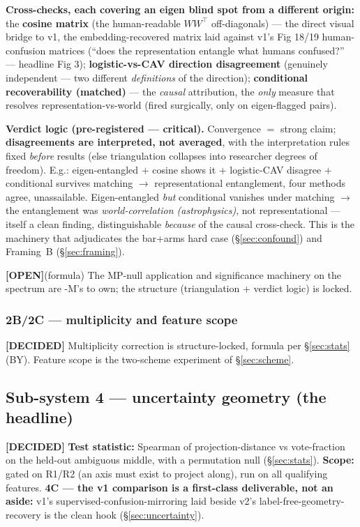 \documentclass[11pt,a4paper]{article}
\newcommand{\dec}{\textcolor{decided}{\sffamily\bfseries[DECIDED]}}
\newcommand{\opn}{\textcolor{openq}{\sffamily\bfseries[OPEN]}}
\begin{document}
\textbf{Cross-checks, each covering an eigen blind spot from a different origin:} the
\textbf{cosine matrix} (the human-readable $WW^\top$ off-diagonals) --- the direct visual bridge
to v1, the embedding-recovered matrix laid against v1's Fig 18/19 human-confusion matrices
(``does the representation entangle what humans confused?'' --- headline Fig 3);
\textbf{logistic-vs-CAV direction disagreement} (genuinely independent --- two different
\emph{definitions} of the direction); \textbf{conditional recoverability (matched)} --- the
\emph{causal} attribution, the \emph{only} measure that resolves representation-vs-world (fired
surgically, only on eigen-flagged pairs).

\begin{decidedbox}
\textbf{Verdict logic (pre-registered --- critical).} Convergence $=$ strong claim;
\textbf{disagreements are interpreted, not averaged}, with the interpretation rules fixed
\emph{before} results (else triangulation collapses into researcher degrees of freedom). E.g.:
eigen-entangled $+$ cosine shows it $+$ logistic-CAV disagree $+$ conditional survives matching
$\rightarrow$ representational entanglement, four methods agree, unassailable. Eigen-entangled
\emph{but} conditional vanishes under matching $\rightarrow$ the entanglement was
\emph{world-correlation (astrophysics)}, not representational --- itself a clean finding,
distinguishable \emph{because} of the causal cross-check. This is the machinery that adjudicates
the bar+arms hard case (\S\ref{sec:confound}) and Framing~B (\S\ref{sec:framing}).
\end{decidedbox}
\opn{}(formula) The MP-null application and significance machinery on the spectrum are -M's to
own; the structure (triangulation + verdict logic) is locked.

\subsubsection{2B/2C --- multiplicity and feature scope}
\dec{} Multiplicity correction is structure-locked, formula per \S\ref{sec:stats} (BY). Feature
scope is the two-scheme experiment of \S\ref{sec:scheme}.

\subsection{Sub-system 4 --- uncertainty geometry (the headline)}\label{sub:uncertainty-machinery}
\dec{} \textbf{Test statistic:} Spearman of projection-distance vs vote-fraction on the held-out
ambiguous middle, with a permutation null (\S\ref{sec:stats}). \textbf{Scope:} gated on R1/R2
(an axis must exist to project along), run on all qualifying features. \textbf{4C --- the v1
comparison is a first-class deliverable, not an aside:} v1's supervised-confusion-mirroring laid
beside v2's label-free-geometry-recovery is the clean hook (\S\ref{sec:uncertainty}).
\end{document}
